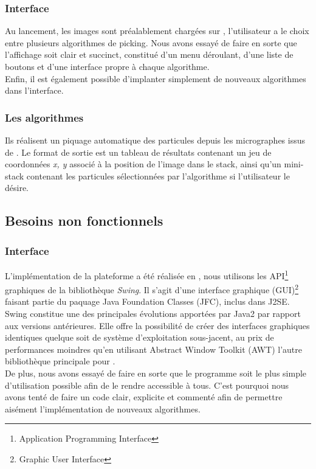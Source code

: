 \subsubsection{Interface}

\noindent
Au lancement, les images sont préalablement chargées sur \imj , l'utilisateur a le choix entre plusieurs algorithmes de picking. %
Nous avons essayé de faire en sorte que l'affichage soit clair et succinct, constitué d'un menu déroulant, d'une liste de boutons et d'une interface propre à chaque algorithme.\\
Enfin, il est également possible d'implanter simplement de nouveaux algorithmes dans l'interface. %

\subsubsection{Les algorithmes}

Ils réalisent un piquage automatique des particules depuis les micrographes issus de \cme. Le format de sortie est un tableau de résultats contenant un jeu de coordonnées \emph{x, y} associé à la position de l'image dans le stack, ainsi qu'un mini-stack contenant les particules sélectionnées par l'algorithme si l'utilisateur le désire.

\subsection{Besoins non fonctionnels}

\subsubsection{Interface}

\noindent
L'implémentation de la plateforme a été réalisée en \java, nous utilisons les API\footnote{Application Programming Interface} graphiques de la bibliothèque \emph{Swing}. 
Il s'agit d'une interface graphique (GUI)\footnote{Graphic User Interface} faisant partie du paquage Java Foundation Classes (JFC), inclus dans J2SE. Swing constitue une des principales évolutions apportées par Java2 par rapport aux versions antérieures. Elle offre la possibilité de créer des interfaces graphiques identiques quelque soit de système d'exploitation sous-jacent, au prix de performances moindres qu'en utilisant Abstract Window Toolkit (AWT) l'autre bibliothèque principale pour \java. \\
De plus, nous avons essayé de faire en sorte que le programme soit le plus simple d'utilisation possible afin de le rendre accessible à tous. C'est pourquoi nous avons tenté de faire un code clair, explicite et commenté afin de permettre aisément l'implémentation de nouveaux algorithmes.

